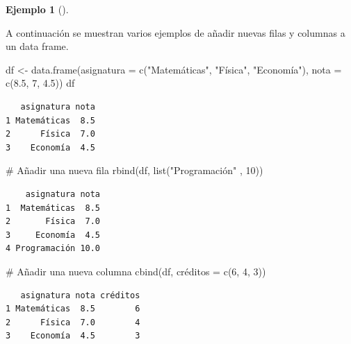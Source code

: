 \documentclass[
  a4paper,
]{scrreport}
\newenvironment{Shaded}{\begin{snugshade}}{\end{snugshade}}
\newcommand{\AttributeTok}[1]{\textcolor[rgb]{0.40,0.45,0.13}{#1}}
\newcommand{\CommentTok}[1]{\textcolor[rgb]{0.37,0.37,0.37}{#1}}
\newcommand{\DecValTok}[1]{\textcolor[rgb]{0.68,0.00,0.00}{#1}}
\newcommand{\FloatTok}[1]{\textcolor[rgb]{0.68,0.00,0.00}{#1}}
\newcommand{\FunctionTok}[1]{\textcolor[rgb]{0.28,0.35,0.67}{#1}}
\newcommand{\NormalTok}[1]{\textcolor[rgb]{0.00,0.23,0.31}{#1}}
\newcommand{\OtherTok}[1]{\textcolor[rgb]{0.00,0.23,0.31}{#1}}
\newcommand{\StringTok}[1]{\textcolor[rgb]{0.13,0.47,0.30}{#1}}
\theoremstyle{definition}
\theoremstyle{definition}
\newtheorem{example}{Ejemplo}[chapter]
\theoremstyle{remark}
\begin{document}
\leavevmode{}%
\begin{example}[]\label{exm-añadir-filas-columnas-data-frame}

A continuación se muestran varios ejemplos de añadir nuevas filas y
columnas a un data frame.

\begin{Shaded}
\begin{Highlighting}[]
\NormalTok{df }\OtherTok{\textless{}{-}} \FunctionTok{data.frame}\NormalTok{(}\AttributeTok{asignatura =} \FunctionTok{c}\NormalTok{(}\StringTok{"Matemáticas"}\NormalTok{, }\StringTok{"Física"}\NormalTok{, }\StringTok{"Economía"}\NormalTok{), }\AttributeTok{nota =} \FunctionTok{c}\NormalTok{(}\FloatTok{8.5}\NormalTok{, }\DecValTok{7}\NormalTok{, }\FloatTok{4.5}\NormalTok{))}
\NormalTok{df}
\end{Highlighting}
\end{Shaded}

\begin{verbatim}
   asignatura nota
1 Matemáticas  8.5
2      Física  7.0
3    Economía  4.5
\end{verbatim}

\begin{Shaded}
\begin{Highlighting}[]
\CommentTok{\# Añadir una nueva fila}
\FunctionTok{rbind}\NormalTok{(df, }\FunctionTok{list}\NormalTok{(}\StringTok{"Programación"}\NormalTok{ , }\DecValTok{10}\NormalTok{))}
\end{Highlighting}
\end{Shaded}

\begin{verbatim}
    asignatura nota
1  Matemáticas  8.5
2       Física  7.0
3     Economía  4.5
4 Programación 10.0
\end{verbatim}

\begin{Shaded}
\begin{Highlighting}[]
\CommentTok{\# Añadir una nueva columna}
\FunctionTok{cbind}\NormalTok{(df, créditos }\OtherTok{=} \FunctionTok{c}\NormalTok{(}\DecValTok{6}\NormalTok{, }\DecValTok{4}\NormalTok{, }\DecValTok{3}\NormalTok{))}
\end{Highlighting}
\end{Shaded}

\begin{verbatim}
   asignatura nota créditos
1 Matemáticas  8.5        6
2      Física  7.0        4
3    Economía  4.5        3
\end{verbatim}

\end{example}
\end{document}
